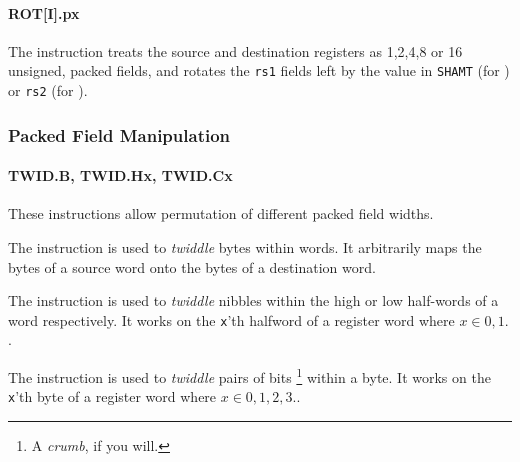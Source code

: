 \paragraph{ROT[I].px}

The instruction  treats the source and destination registers as
1,2,4,8 or 16 unsigned, packed fields, and rotates the {\tt rs1} fields
left by the value in {\tt SHAMT} (for ) or {\tt rs2} 
(for ).

\subsubsection{Packed Field Manipulation}


\paragraph{TWID.B, TWID.Hx, TWID.Cx}

These instructions allow permutation of different packed field widths.

The  instruction is used to {\em twiddle} bytes within words.
It arbitrarily maps the bytes of a source word onto the bytes of a
destination word.

The  instruction is used to {\em twiddle} nibbles within
the high or low half-words of a word respectively.
It works on the {\tt x}'th halfword of a register word where
$x\in{0,1}.$.

The  instruction is used to {\em twiddle} pairs of bits
\footnote{A {\em crumb}, if you will.}
within a byte. It works on the {\tt x}'th byte of a register word where
$x\in{0,1,2,3}.$.

